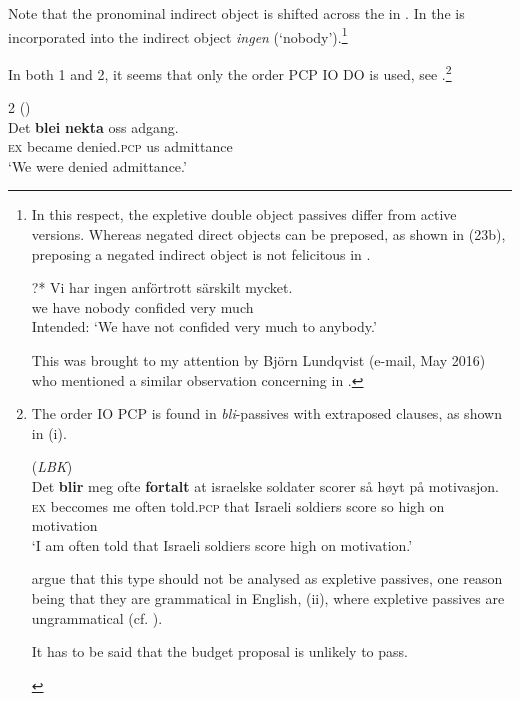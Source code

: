 \documentclass[output=paper]{LSP/langsci}
\begin{document}
\noindent Note that the pronominal indirect object is shifted across the  in . In  the  is incorporated into the indirect object \textit{ingen} (‘nobody’).\footnote{In this respect, the expletive double object passives differ from active versions.  Whereas negated direct objects can be preposed, as shown in (23b), preposing a negated indirect object is not felicitous in . 
\begin{xlist}[(i)]
  \gll ?* Vi har ingen anförtrott särskilt mycket.\\
 {} we have nobody confided  very much
                \\
                \glt Intended: ‘We have not confided very much to anybody.'

\end{xlist}

\noindent This was brought to my attention by Björn Lundqvist (e-mail, May 2016) who mentioned a similar observation concerning  in \citet[22]{Lødrup1989}.
}

\noindent In both  1 and 2, it seems that only the order PCP IO DO is used, see .\footnote{The order IO PCP is found in  \textit{bli}{}-passives with extraposed clauses, as shown in (i).

\begin{xlist}[(i)]
   (\textit{LBK}) \\
 \gll Det \textbf{blir}  meg ofte \textbf{fortalt} at israelske soldater   scorer så høyt   på   motivasjon.    \\
   \textsc{ex}  beccomes me often told.\textsc{pcp} that 
       Israeli soldiers    score     so high  on  motivation\\
       \glt ‘I am often told that Israeli soldiers score high on motivation.'
\end{xlist}
\citet{EngdahLaanemetsl2015opersonlig} argue that this type should not be analysed as expletive passives, one reason being that they are grammatical in English, (ii), where expletive passives are ungrammatical (cf. \citealt{CarnieHarley2005}).
\begin{xlist}[(ii)]
It has to be said that the budget proposal is unlikely to pass.
\end{xlist}
}


\ea%
    \label{ex:engdahl:25}
     2 (\citealt[845]{FaarlundEtAl1997})\\
\gll   	   Det   \textbf{blei}  \textbf{nekta}    oss   adgang.\\
  \textsc{ex}    became  denied\textsc{.pcp}  us    admittance\\
  \glt ‘We were denied admittance.'
\z
\end{document}
